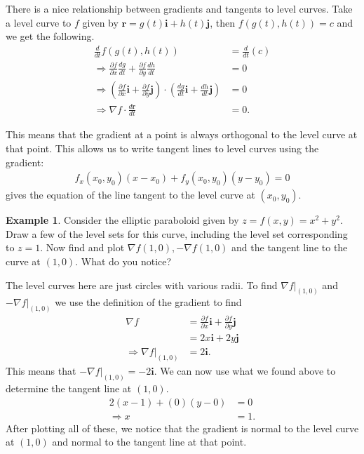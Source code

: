 \documentclass[12pt, letter]{article}
\theoremstyle{plain}
\numberwithin{theorem}{section}
\theoremstyle{definition}
\newtheorem{example}[theorem]{Example}
\begin{document}
\bigskip

\hrulefill

\bigskip

There is a nice relationship between gradients and tangents to level curves. Take a level curve to $f$ given by $\bm{r} = g(t) \bm{i} + h(t) \bm{j}$, then $f(g(t),h(t)) = c$ and we get the following.
\begin{align*}
\frac{d}{dt} f(g(t),h(t)) &= \frac{d}{dt}(c)\\
\Rightarrow \frac{\partial f}{\partial x} \frac{dg}{dt} + \frac{\partial f}{\partial y} \frac{dh}{dt} &= 0\\
\Rightarrow \left(\frac{\partial f}{\partial x} \bm{i}+\frac{\partial f}{\partial y} \bm{j}\right) \cdot \left(\frac{dg}{dt} \bm{i}+\frac{dh}{dt} \bm{j}\right) &= 0\\
\Rightarrow \nabla f \cdot \frac{d\bm{r}}{dt} &= 0.
\end{align*}

\bigskip

This means that the gradient at a point is always orthogonal to the level curve at that point. This allows us to write tangent lines to level curves using the gradient:
\begin{align*}
f_x(x_0,y_0)(x-x_0) + f_y(x_0,y_0)(y-y_0) = 0
\end{align*}
gives the equation of the line tangent to the level curve at $(x_0,y_0)$.

\bigskip

\hrulefill

\bigskip

\begin{example}
Consider the elliptic paraboloid given by $z=f(x,y)=x^2+y^2$. Draw a few of the level sets for this curve, including the level set corresponding to $z=1$. Now find and plot $\nabla f(1,0), -\nabla f(1,0)$ and the tangent line to the curve at $(1,0)$. What do you notice?

\smallskip

The level curves here are just circles with various radii. To find $\nabla f\rvert_{(1,0)}$ and $-\nabla f\rvert_{(1,0)}$ we use the definition of the gradient to find
\begin{align*}
\nabla f &= \frac{\partial f}{\partial x} \bm{i} + \frac{\partial f}{\partial y} \bm{j}\\
&= 2x \bm{i} + 2y \bm{j}\\
\Rightarrow \nabla f\rvert_{(1,0)} &= 2\bm{i}.
\end{align*}
This means that $-\nabla f \rvert_{(1,0)} = -2\bm{i}$. We can now use what we found above to determine the tangent line at $(1,0)$.
\begin{align*}
2(x-1)+(0)(y-0) &= 0\\
\Rightarrow x &= 1.
\end{align*}
After plotting all of these, we notice that the gradient is normal to the level curve at $(1,0)$ and normal to the tangent line at that point.
\end{example}
\end{document}
